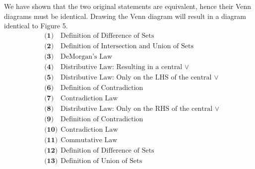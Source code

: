 We have shown that the two original statements are equivalent, hence their Venn diagrams must be identical. Drawing the Venn diagram will result in a diagram identical to Figure 5.
\begin{align*}
    &\textbf{(1)} \quad \text{Definition of Difference of Sets} \\
    &\textbf{(2)} \quad \text{Definition of Intersection and Union of Sets}\\
    &\textbf{(3)} \quad \text{DeMorgan's Law}\\
    &\textbf{(4)} \quad \text{Distributive Law: Resulting in a central $\vee$}\\
    &\textbf{(5)} \quad \text{Distributive Law: Only on the LHS of the central $\vee$}\\
    &\textbf{(6)} \quad \text{Definition of Contradiction}\\
    &\textbf{(7)} \quad \text{Contradiction Law}\\
    &\textbf{(8)} \quad \text{Distributive Law: Only on the RHS of the central $\vee$}\\
    &\textbf{(9)} \quad \text{Definition of Contradiction}\\
    &\textbf{(10)} \:\: \text{Contradiction Law}\\
    &\textbf{(11)}\:\: \text{Commutative Law} \\
    &\textbf{(12)}\:\: \text{Definition of Difference of Sets}  \\
    &\textbf{(13)}\:\: \text{Definition of Union of Sets}  \\
\end{align*}
\pagebreak